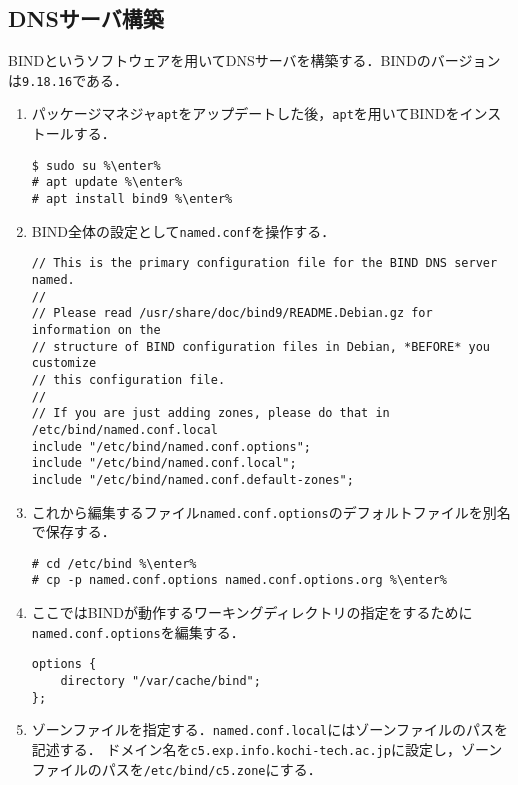 \subsection{DNSサーバ構築}
BINDというソフトウェアを用いてDNSサーバを構築する．BINDのバージョンは\texttt{9.18.16}である．
\newcommand{\enter}{\ovalbox{Enter⏎}}
\begin{enumerate}
    \renewcommand{\labelenumi}{\textbf{\theenumi}.\ }
    \item パッケージマネジャ\texttt{apt}をアップデートした後，\texttt{apt}を用いてBINDをインストールする．
          \begin{lstlisting}
$ sudo su %\enter%
# apt update %\enter%
# apt install bind9 %\enter%
    \end{lstlisting}
    \item BIND全体の設定として\texttt{named.conf}を操作する．
          \begin{lstlisting}[caption={\ttfamily /etc/bind/named.conf},style=file]
// This is the primary configuration file for the BIND DNS server named.
//
// Please read /usr/share/doc/bind9/README.Debian.gz for information on the
// structure of BIND configuration files in Debian, *BEFORE* you customize
// this configuration file.
//
// If you are just adding zones, please do that in /etc/bind/named.conf.local
include "/etc/bind/named.conf.options";
include "/etc/bind/named.conf.local";
include "/etc/bind/named.conf.default-zones";
\end{lstlisting}
    \item これから編集するファイル\texttt{named.conf.options}のデフォルトファイルを別名で保存する．
          \begin{lstlisting}
# cd /etc/bind %\enter%
# cp -p named.conf.options named.conf.options.org %\enter%
\end{lstlisting}
    \item ここではBINDが動作するワーキングディレクトリの指定をするために\texttt{named.conf.options}を編集する．
          \begin{lstlisting}[caption={\ttfamily /etc/bind/named.conf.options},style=file]
options {
    directory "/var/cache/bind";
};
\end{lstlisting}
    \item ゾーンファイルを指定する．\texttt{named.conf.local}にはゾーンファイルのパスを記述する．
          ドメイン名を\texttt{c5.exp.info.kochi-tech.ac.jp}に設定し，ゾーンファイルのパスを\texttt{/etc/bind/c5.zone}にする．
          \begin{lstlisting}[style=file,caption={\ttfamily /etc/bind/named.conf.local}]

\end{lstlisting}
\end{enumerate}

